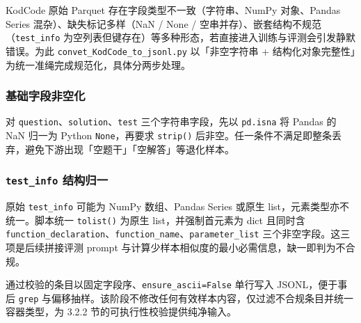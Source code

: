 
KodCode 原始 Parquet 存在字段类型不一致（字符串、NumPy 对象、Pandas Series 混杂）、缺失标记多样（NaN / None / 空串并存）、嵌套结构不规范（\texttt{test\_info} 为空列表但键存在）等多种形态，若直接进入训练与评测会引发静默错误。为此 \texttt{convet\_KodCode\_to\_jsonl.py} 以「非空字符串 + 结构化对象完整性」为统一准绳完成规范化，具体分两步处理。

\subsubsection{基础字段非空化}
对 \texttt{question}、\texttt{solution}、\texttt{test} 三个字符串字段，先以 \texttt{pd.isna} 将 Pandas 的 NaN 归一为 Python \texttt{None}，再要求 \texttt{strip()} 后非空。任一条件不满足即整条丢弃，避免下游出现「空题干」「空解答」等退化样本。

\subsubsection{\texttt{test\_info} 结构归一}
原始 \texttt{test\_info} 可能为 NumPy 数组、Pandas Series 或原生 list，元素类型亦不统一。脚本统一 \texttt{tolist()} 为原生 list，并强制首元素为 dict 且同时含 \texttt{function\_declaration}、\texttt{function\_name}、\texttt{parameter\_list} 三个非空字段。这三项是后续拼接评测 prompt 与计算少样本相似度的最小必需信息，缺一即判为不合规。

通过校验的条目以固定字段序、\texttt{ensure\_ascii=False} 单行写入 JSONL，便于事后 \texttt{grep} 与偏移抽样。该阶段不修改任何有效样本内容，仅过滤不合规条目并统一容器类型，为 3.2.2 节的可执行性校验提供纯净输入。